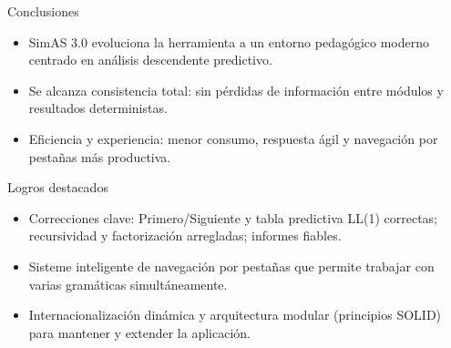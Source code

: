 \begin{frame}{Conclusiones}
  \begin{itemize}
    \item SimAS 3.0 evoluciona la herramienta a un entorno pedagógico moderno centrado en análisis descendente predictivo.
    \item Se alcanza consistencia total: sin pérdidas de información entre módulos y resultados deterministas.
    \item Eficiencia y experiencia: menor consumo, respuesta ágil y navegación por pestañas más productiva.
  \end{itemize}
\end{frame}

\begin{frame}{Logros destacados}
  \begin{itemize}
    \item Correcciones clave: Primero/Siguiente y tabla predictiva LL(1) correctas; recursividad y factorización arregladas; informes fiables.
    \item Sisteme inteligente de navegación por pestañas que permite trabajar con varias gramáticas simultáneamente.
    \item Internacionalización dinámica y arquitectura modular (principios SOLID) para mantener y extender la aplicación.
  \end{itemize}
\end{frame}


